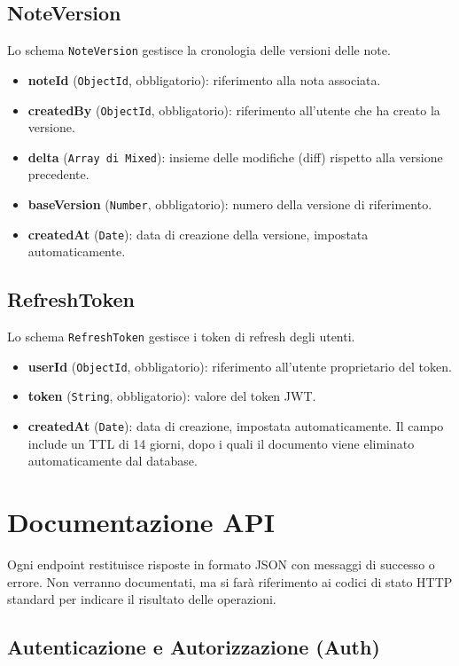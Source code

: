 \documentclass[11pt]{article}
\begin{document}
\subsection{NoteVersion}
Lo schema \texttt{NoteVersion} gestisce la cronologia delle versioni delle note.  
\begin{itemize}
    \item \textbf{noteId} (\texttt{ObjectId}, obbligatorio): riferimento alla nota associata.
    \item \textbf{createdBy} (\texttt{ObjectId}, obbligatorio): riferimento all’utente che ha creato la versione.
    \item \textbf{delta} (\texttt{Array di Mixed}): insieme delle modifiche (diff) rispetto alla versione precedente.
    \item \textbf{baseVersion} (\texttt{Number}, obbligatorio): numero della versione di riferimento.
    \item \textbf{createdAt} (\texttt{Date}): data di creazione della versione, impostata automaticamente.
\end{itemize}

\subsection{RefreshToken}
Lo schema \texttt{RefreshToken} gestisce i token di refresh degli utenti.  
\begin{itemize}
    \item \textbf{userId} (\texttt{ObjectId}, obbligatorio): riferimento all’utente proprietario del token.
    \item \textbf{token} (\texttt{String}, obbligatorio): valore del token JWT.
    \item \textbf{createdAt} (\texttt{Date}): data di creazione, impostata automaticamente. Il campo include un TTL di 14 giorni, dopo i quali il documento viene eliminato automaticamente dal database.
\end{itemize}
\newpage
\section{Documentazione API}
Ogni endpoint restituisce risposte in formato JSON con messaggi di successo o errore. Non verranno documentati, ma si farà riferimento ai codici di stato HTTP standard per indicare il risultato delle operazioni.
\subsection{Autenticazione e Autorizzazione (Auth)}
\end{document}
